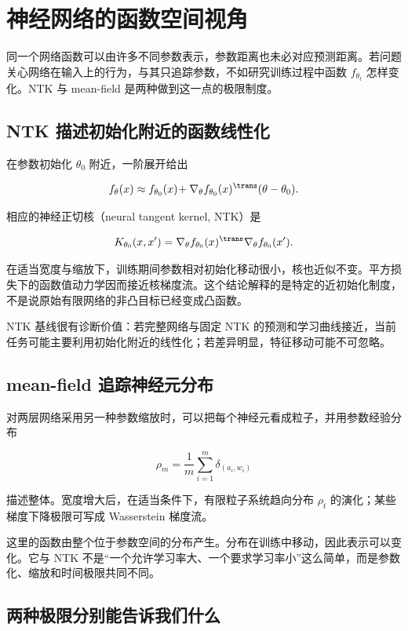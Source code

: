 \section{神经网络的函数空间视角}
\label{sec:14-Deep-Learning/07-Interpretability-Mathematics/01}

同一个网络函数可以由许多不同参数表示，参数距离也未必对应预测距离。若问题关心网络在输入上的行为，与其只追踪参数，不如研究训练过程中函数 \(f_{\theta_t}\) 怎样变化。NTK 与 mean-field 是两种做到这一点的极限制度。


\subsection{NTK 描述初始化附近的函数线性化}

在参数初始化 \(\theta_0\) 附近，一阶展开给出

\[
f_\theta(x)
\approx f_{\theta_0}(x)
\!+\nabla_\theta f_{\theta_0}(x)^{\trans}(\theta-\theta_0).
\]

相应的神经正切核（neural tangent kernel, NTK）是

\[
K_{\theta_0}(x,x')
=\nabla_\theta f_{\theta_0}(x)^{\trans}
\nabla_\theta f_{\theta_0}(x').
\]

在适当宽度与缩放下，训练期间参数相对初始化移动很小，核也近似不变。平方损失下的函数值动力学因而接近核梯度流。这个结论解释的是特定的近初始化制度，不是说原始有限网络的非凸目标已经变成凸函数。

NTK 基线很有诊断价值：若完整网络与固定 NTK 的预测和学习曲线接近，当前任务可能主要利用初始化附近的线性化；若差异明显，特征移动可能不可忽略。

\subsection{mean-field 追踪神经元分布}

对两层网络采用另一种参数缩放时，可以把每个神经元看成粒子，并用参数经验分布

\[
\rho_m=\frac1m\sum_{i=1}^m\delta_{(a_i,w_i)}
\]

描述整体。宽度增大后，在适当条件下，有限粒子系统趋向分布 \(\rho_t\) 的演化；某些梯度下降极限可写成 Wasserstein 梯度流。

这里的函数由整个位于参数空间的分布产生。分布在训练中移动，因此表示可以变化。它与 NTK 不是``一个允许学习率大、一个要求学习率小''这么简单，而是参数化、缩放和时间极限共同不同。

\subsection{两种极限分别能告诉我们什么}

